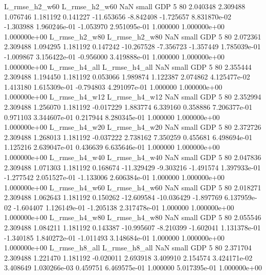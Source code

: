  L_rmse_h2_w60  L_rmse_h2_w60                   NaN      small      GDP                 5 80 2.040348       2.309488 1.076746       1.181192    0.141227    -11.653656     -8.842408    -1.725657   8.831870e-02 -1.303988 1.960246e-01    -1.053970   2.951095e-01            1.000000    1.000000e+00        1.000000e+00
 L_rmse_h2_w80  L_rmse_h2_w80                   NaN      small      GDP                 5 80 2.072361       2.309488 1.094295       1.181192    0.147242    -10.267528     -7.356723    -1.357449   1.785039e-01 -1.009867 3.156422e-01    -0.956000   3.419888e-01            1.000000    1.000000e+00        1.000000e+00
 L_rmse_h4_all  L_rmse_h4_all                   NaN      small      GDP                 5 80 2.355444       2.309488 1.194450       1.181192    0.053066      1.989874      1.122387     2.074862   4.125477e-02  1.413180 1.615309e-01    -0.794803   4.291097e-01            1.000000    1.000000e+00        1.000000e+00
 L_rmse_h4_w12  L_rmse_h4_w12                   NaN      small      GDP                 5 80 2.352994       2.309488 1.256070       1.181192   -0.017229      1.883774      6.339160     0.358886   7.206377e-01  0.971103 3.344607e-01     0.217944   8.280345e-01            1.000000    1.000000e+00        1.000000e+00
 L_rmse_h4_w20  L_rmse_h4_w20                   NaN      small      GDP                 5 80 2.372726       2.309488 1.268013       1.181192   -0.037222      2.738162      7.350259     0.455681   6.498694e-01  1.125216 2.639047e-01     0.436639   6.635646e-01            1.000000    1.000000e+00        1.000000e+00
 L_rmse_h4_w40  L_rmse_h4_w40                   NaN      small      GDP                 5 80 2.047836       2.309488 1.071303       1.181192    0.168674    -11.329429     -9.303216    -1.491574   1.397933e-01 -1.277542 2.051527e-01    -1.133006   2.606384e-01            1.000000    1.000000e+00        1.000000e+00
 L_rmse_h4_w60  L_rmse_h4_w60                   NaN      small      GDP                 5 80 2.018271       2.309488 1.062643       1.181192    0.150262    -12.609584    -10.036429    -1.897769   6.137959e-02 -1.604407 1.126149e-01    -1.205138   2.317478e-01            1.000000    1.000000e+00        1.000000e+00
 L_rmse_h4_w80  L_rmse_h4_w80                   NaN      small      GDP                 5 80 2.055546       2.309488 1.084211       1.181192    0.143387    -10.995607     -8.210399    -1.602041   1.131378e-01 -1.340185 1.840272e-01    -1.011493   3.148684e-01            1.000000    1.000000e+00        1.000000e+00
 L_rmse_h8_all  L_rmse_h8_all                   NaN      small      GDP                 5 80 2.371704       2.309488 1.221470       1.181192   -0.020011      2.693918      3.409910     2.154574   3.424171e-02  3.408649 1.030266e-03     0.459751   6.469575e-01            1.000000    5.017395e-01        1.000000e+00
